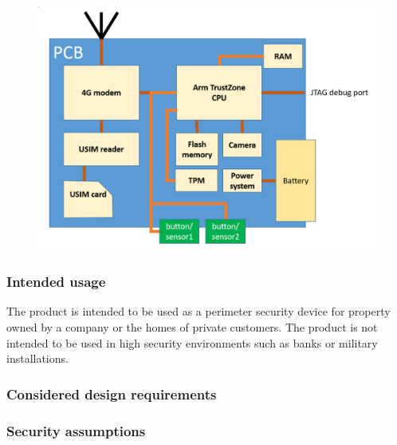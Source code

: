 \documentclass[10pt]{article}
\begin{document}
      \begin{figure}[!h]
        \center
        \includegraphics[width=\textwidth]{input/pcb_camera.png}
      \end{figure}

      \subsubsection{Intended usage}

        The product is intended to be used as a perimeter security device for
        property owned by a company or the homes of private customers. The
        product is not intended to be used in high security environments such
        as banks or military installations.

      \subsubsection{Considered design requirements}


      \subsubsection{Security assumptions}

         \begin{itemize}
         \end{itemize}	
\end{document}
